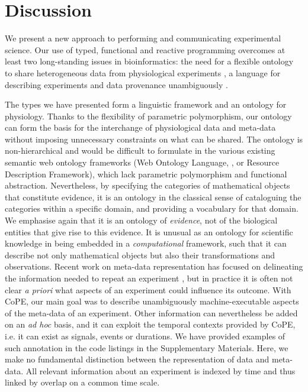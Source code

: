\section*{Discussion}

We present a new approach to performing and communicating experimental
science.  Our use of typed, functional and reactive programming
overcomes at least two long-standing issues in bioinformatics: the
need for a flexible ontology to share heterogeneous data from
physiological experiments \citep{Amari2002}, a language for describing
experiments and data provenance unambiguously \citep{Pool2002,
  Murray-Rust2002}.

The types we have presented form a linguistic framework and an
ontology for physiology. Thanks to the flexibility of parametric
polymorphism, our ontology can form the basis for the interchange of
physiological data and meta-data without imposing unnecessary
constraints on what can be shared. The ontology is non-hierarchical
and would be difficult to formulate in the various existing semantic
web ontology frameworks (Web Ontology Language, \citep{owlref}, or
Resource Description Framework), which lack parametric polymorphism
and functional abstraction. Nevertheless, by specifying the categories
of mathematical objects that constitute evidence, it is an ontology in
the classical sense of cataloguing the categories within a specific
domain, and providing a vocabulary for that domain. We emphasise again
that it is an ontology of \emph{evidence}, not of the biological
entities that give rise to this evidence. It is unusual as an ontology
for scientific knowledge in being embedded in a \emph{computational}
framework, such that it can describe not only mathematical objects but
also their transformations and observations. Recent work on meta-data
representation \citep{Bower2009} has focused on delineating the
information needed to repeat an experiment \citep{Taylor2007,
  Gibson2008}, but in practice it is often not clear \emph{a priori}
what aspects of an experiment could influence its outcome. With CoPE,
our main goal was to describe unambiguously machine-executable aspects
of the meta-data of an experiment. Other information can nevertheless
be added on an \emph{ad hoc} basis, and it can exploit the temporal
contexts provided by CoPE, i.e. it can exist as signals, events or
durations. We have provided examples of such annotation in the code
listings in the Supplementary Materials. Here, we make no
fundamental distinction between the representation of data and
meta-data. All relevant information about an experiment is indexed by
time and thus linked by overlap on a common time scale.

